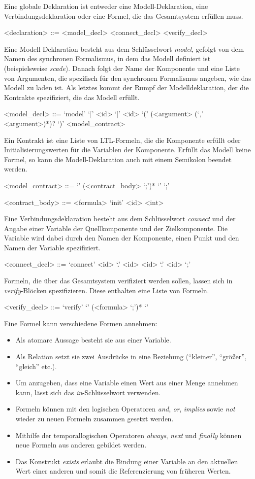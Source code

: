 Eine globale Deklaration ist entweder eine Modell-Deklaration, eine Verbindungsdeklaration oder eine Formel, die das Gesamtsystem erfüllen muss.
\begin{grammar}
  <declaration> ::= <model\_decl>
  \alt <connect\_decl>
  \alt <verify\_decl>
\end{grammar}
Eine Modell Deklaration besteht aus dem Schlüsselwort \emph{model}, gefolgt von dem Namen des synchronen Formalismus, in dem das Modell definiert ist (beispielsweise \emph{scade}).
Danach folgt der Name der Komponente und eine Liste von Argumenten, die spezifisch für den synchronen Formalismus angeben, wie das Modell zu laden ist.
Als letztes kommt der Rumpf der Modelldeklaration, der die Kontrakte spezifiziert, die das Modell erfüllt.
\begin{grammar}
  <model\_decl> ::= `model' `[' <id> `]' <id> `(' (<argument> (`,' <argument>)*)? `)' <model\_contract>
\end{grammar}
Ein Kontrakt ist eine Liste von LTL-Formeln, die die Komponente erfüllt oder Initialisierungswerten für die Variablen der Komponente.
Erfüllt das Modell keine Formel, so kann die Modell-Deklaration auch mit einem Semikolon beendet werden.
\begin{grammar}
  <model\_contract> ::= `{' (<contract\_body> `;')* `}'
  \alt `;'

  <contract\_body> ::= <formula>
  \alt `init' <id> <int>
\end{grammar}
Eine Verbindungsdeklaration besteht aus dem Schlüsselwort \emph{connect} und der Angabe einer Variable der Quellkomponente und der Zielkomponente.
Die Variable wird dabei durch den Namen der Komponente, einen Punkt und den Namen der Variable spezifiziert.
\begin{grammar}
  <connect\_decl> ::= `connect' <id> `.' <id> <id> `.' <id> `;'
\end{grammar}
Formeln, die über das Gesamtsystem verifiziert werden sollen, lassen sich in \emph{verify}-Blöcken spezifizieren.
Diese enthalten eine Liste von Formeln.
\begin{grammar}
  <verify\_decl> ::= `verify' `{' (<formula> `;')* `}'
\end{grammar}
Eine Formel kann verschiedene Formen annehmen:
\begin{itemize}
\item Als atomare Aussage besteht sie aus einer Variable.
\item Als Relation setzt sie zwei Ausdrücke in eine Beziehung ("`kleiner"', "`größer"', "`gleich"' etc.).
\item Um anzugeben, dass eine Variable einen Wert aus einer Menge annehmen kann, lässt sich das \emph{in}-Schlüsselwort verwenden.
\item Formeln können mit den logischen Operatoren \emph{and}, \emph{or}, \emph{implies} sowie \emph{not} wieder zu neuen Formeln zusammen gesetzt werden.
\item Mithilfe der temporallogischen Operatoren \emph{always}, \emph{next} und \emph{finally} können neue Formeln aus anderen gebildet werden.
\item Das Konstrukt \emph{exists} erlaubt die Bindung einer Variable an den aktuellen Wert einer anderen und somit die Referenzierung von früheren Werten.
\end{itemize}
